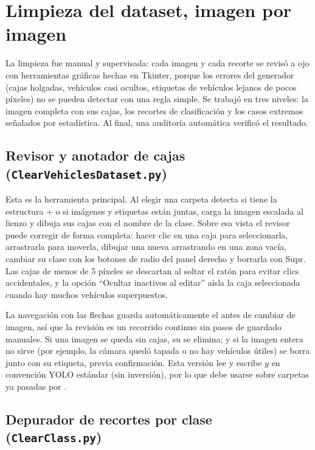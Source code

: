 \documentclass[11pt,a4paper]{article}
\begin{document}
\section{Limpieza del dataset, imagen por imagen}

La limpieza fue manual y supervisada: cada imagen y cada recorte se revisó a ojo con herramientas gráficas hechas en Tkinter, porque los errores del generador (cajas holgadas, vehículos casi ocultos, etiquetas de vehículos lejanos de pocos píxeles) no se pueden detectar con una regla simple. Se trabajó en tres niveles: la imagen completa con sus cajas, los recortes de clasificación y los casos extremos señalados por estadística. Al final, una auditoría automática verificó el resultado.

\subsection{Revisor y anotador de cajas (\texorpdfstring{\texttt{ClearVehiclesDataset.py}}{ClearVehiclesDataset.py})}

Esta es la herramienta principal. Al elegir una carpeta detecta si tiene la estructura  +  o si imágenes y etiquetas están juntas, carga la imagen escalada al lienzo y dibuja sus cajas con el nombre de la clase. Sobre esa vista el revisor puede corregir de forma completa: hacer clic en una caja para seleccionarla, arrastrarla para moverla, dibujar una nueva arrastrando en una zona vacía, cambiar su clase con los botones de radio del panel derecho y borrarla con Supr. Las cajas de menos de 5 píxeles se descartan al soltar el ratón para evitar clics accidentales, y la opción ``Ocultar inactivos al editar'' aísla la caja seleccionada cuando hay muchos vehículos superpuestos.

La navegación con las flechas guarda automáticamente el  antes de cambiar de imagen, así que la revisión es un recorrido continuo sin pasos de guardado manuales. Si una imagen se queda sin cajas, su  se elimina; y si la imagen entera no sirve (por ejemplo, la cámara quedó tapada o no hay vehículos útiles) se borra junto con su etiqueta, previa confirmación. Esta versión lee y escribe $y$ en convención YOLO estándar (sin inversión), por lo que debe usarse sobre carpetas ya pasadas por .

\subsection{Depurador de recortes por clase (\texorpdfstring{\texttt{ClearClass.py}}{ClearClass.py})}
\end{document}

